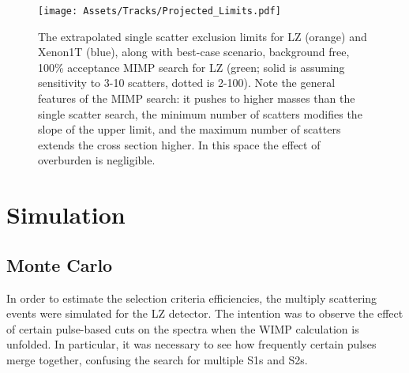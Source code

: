 \begin{figure}
    \centering
    \texttt{[image: Assets/Tracks/Projected\_Limits.pdf]}
    \caption[The extrapolated single scatter exclusion limits for LZ (orange) and Xenon1T (blue), along with best-case scenario, background free, 100\% acceptance MIMP search for LZ]%
    {The extrapolated single scatter exclusion limits for LZ (orange) and Xenon1T (blue), along with best-case scenario, background free, 100\% acceptance MIMP search for LZ (green; solid is assuming sensitivity to 3-10 scatters, dotted is 2-100).
    Note the general features of the MIMP search: it pushes to higher masses than the single scatter search, the minimum number of scatters modifies the slope of the upper limit, and the maximum number of scatters extends the cross section higher.
    In this space the effect of overburden is negligible\cite{bramante_saturated_2018,clark_direct_2020}.
    }
    \label{fig:mimp_projected}
\end{figure}

\afterpage{\FloatBarrier}
\section{Simulation}
\label{sec:mimp_sims}
\subsection {Monte Carlo}
In order to estimate the selection criteria efficiencies, the multiply scattering events were simulated for the LZ detector.
The intention was to observe the effect of certain pulse-based cuts on the spectra when the WIMP calculation is unfolded.
In particular, it was necessary to see how frequently certain pulses merge together, confusing the search for multiple S1s and S2s.

